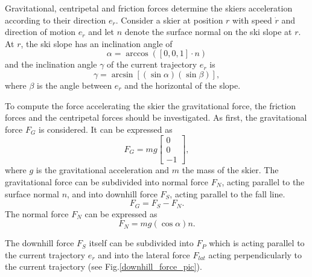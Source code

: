 \documentclass[12pt,a4paper,twoside]{book}
\begin{document}
Gravitational, centripetal and friction forces determine the skiers acceleration according to their direction $e_{\dot{r}}$. Consider a skier at position $r$ with speed $\dot{r}$ and direction of motion $e_{\dot{r}}$ and let $n$ denote the surface normal on the ski slope at $r$. At $r$, the ski slope has an inclination angle of
\begin{equation}
\alpha =\arccos(\left[0,0,1\right] \cdot n)
\end{equation}
and the inclination angle $\gamma$ of the current trajectory $e_{\dot{r}}$ is
\begin{equation}\label{incl_angle}
\gamma =\arcsin[(\sin \alpha )(\sin \beta )],
\end{equation}
where $\beta$ is the angle between $e_{\dot{r}}$ and the horizontal of the slope.

To compute the force accelerating the skier the gravitational force, the friction forces and the centripetal forces should be investigated. As first, the gravitational force $F_G$ is considered. It can be expressed as
\begin{equation}
F_G=mg\left[\begin{matrix}0\\0\\-1\end{matrix}\right],
\end{equation}
where $g$ is the gravitational acceleration and $m$ the mass of the skier. The gravitational force can be subdivided into normal force $F_N$, acting parallel to the surface normal $n$, and into downhill force $F_S$, acting parallel to the fall line.
\begin{equation}\label{downhill_force}
F_G=F_S-F_N.
\end{equation}
The normal force $F_N$ can be expressed as
\begin{equation}
F_N=mg(\cos \alpha )n.
\end{equation}

The downhill force $F_S$ itself can be subdivided into $F_P$ which is acting parallel to the current trajectory $e_{\dot{r}}$ and into the lateral force $F_{lat}$ acting perpendicularly to the current trajectory (see Fig.\ref{downhill_force_pic}).
\end{document}
